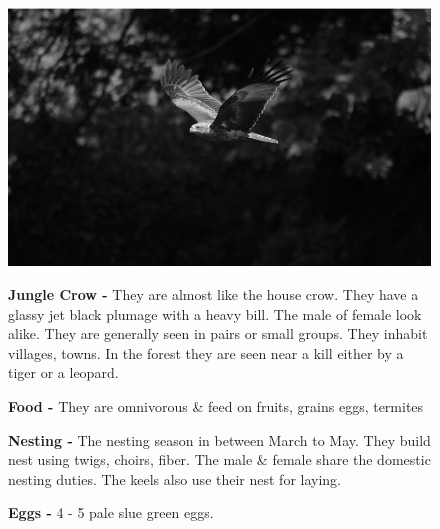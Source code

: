 \begin{figure}[H]
\begin{center}
\includegraphics{figure/Land_birds/01_pariah_kite/pariah-kite.eps}
\end{center}
\medskip
\noindent
{\bf Jungle Crow -} They are almost like the house crow. They have a glassy jet black plumage with a heavy bill. The male of female look alike. They are generally seen in pairs or small groups. They inhabit villages, towns. In the forest they are seen near a kill either by a tiger or a leopard.

\medskip
{\bf Food -} They are omnivorous \& feed on fruits, grains eggs, termites

{\bf Nesting -} The nesting season in between March to May. They build nest using twigs, choirs, fiber. The male \& female share the domestic nesting duties. The keels also use their nest for laying. 

{\bf Eggs -} 4 - 5 pale slue green eggs.
\end{figure}

\vfill\eject

~\phantom{a}
\vfill

